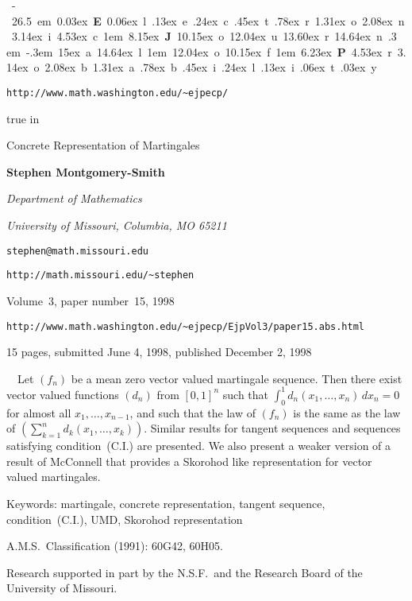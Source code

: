 {
\nopagenumbers

\null\vfill
{
\centerline{\hbox{
\vrule height -0.4 pt depth 0.8 pt width 26.5 em
\kern - 26.5 em
\raise  0.03ex  \hbox{\bf E} 
\raise  0.06ex \hbox{l} 
\raise .13ex \hbox{e}
\raise .24ex \hbox{c} 
\raise .45ex \hbox{t} 
\raise .78ex \hbox{r} 
\raise 1.31ex \hbox{o} 
\raise 2.08ex \hbox{n} 
\raise 3.14ex \hbox{i} 
\raise 4.53ex \hbox{c} 
\kern   1em
\raise 8.15ex \hbox{\bf J} 
\raise 10.15ex \hbox{o} 
\raise 12.04ex \hbox{u} 
\raise 13.60ex \hbox{r} 
\raise 14.64ex \hbox{n} 
\kern .3 em
\vrule
\kern -.3em
\raise 15ex \hbox{a} 
\raise 14.64ex \hbox{l} 
\kern   1em
\raise 12.04ex \hbox{o} 
\raise 10.15ex \hbox{f} 
\kern   1em
\raise 6.23ex \hbox{\bf P} 
\raise 4.53ex \hbox{r} 
\raise 3.14ex \hbox{o} 
\raise 2.08ex \hbox{b} 
\raise 1.31ex \hbox{a} 
\raise .78ex \hbox{b} 
\raise .45ex \hbox{i} 
\raise .24ex \hbox{l} 
\raise .13ex \hbox{i} 
\raise .06ex \hbox{t} 
\raise .03ex \hbox{y}
}}}

\bigskip

\centerline{\tt http://www.math.washington.edu/\~{}ejpecp/}

 true in

\centerline{\twelvebf Concrete Representation of Martingales}

\bigskip

\centerline{\bf Stephen Montgomery-Smith}
\centerline{\it Department of Mathematics}
\centerline{\it University of Missouri, Columbia, MO 65211}
\centerline{\tt stephen@math.missouri.edu}
\centerline{\tt http://math.missouri.edu/\~{}stephen}

\bigskip
\centerline{Volume~3, paper number~15, 1998}
\centerline{\tt http://www.math.washington.edu/\~{}ejpecp/EjpVol3/paper15.abs.html}

\bigskip
\centerline{15 pages, submitted June 4, 1998, published December 2, 1998}

\bigskip
{}\ \ 
Let $(f_n)$ be a mean zero
vector valued martingale sequence.  Then there exist
vector valued functions $(d_n)$ from $[0,1]^n$ such that
$\int_0^1 d_n(x_1,\dots,x_n)\,dx_n = 0$ for almost all
$x_1,\dots,x_{n-1}$, and such that the law of $(f_n)$
is the same as the law of 
$(\sum_{k=1}^n d_k(x_1,\dots,x_k))$.
Similar results for tangent sequences and sequences satisfying condition~(C.I.)
are presented.  
We also present a weaker 
version of a result of McConnell that
provides a Skorohod like representation for vector valued
martingales.

\bigskip 
\noindent Keywords: martingale, concrete representation, tangent sequence,
condition~(C.I.), UMD, Skorohod representation

\bigskip
\noindent A.M.S.\ Classification (1991): 60G42, 60H05.

\bigskip
\noindent Research supported in part by the N.S.F.\ and the Research Board of
the University of Missouri.

\vfill\eject
}


